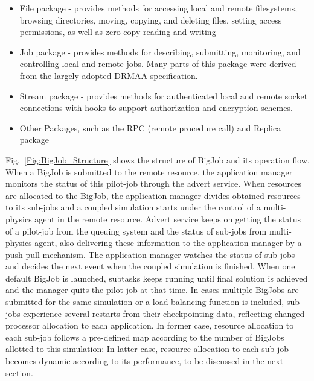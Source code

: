 \documentclass[conference,final]{IEEEtran}
\newcommand{\skonote}[1]{ {\textcolor{blue} { ***Jeff: #1 }}}
\newcommand{\skonote}[1]{}
\begin{document}


\begin{itemize}
\item File package - provides methods for accessing local and remote
 filesystems, browsing directories, moving, copying, and deleting
 files, setting access permissions, as well as zero-copy reading and
 writing
\item Job package - provides methods for describing, submitting,
 monitoring, and controlling local and remote jobs. Many parts of
 this package were derived from the largely adopted
 DRMAA %
 specification.
\item Stream package - provides methods for authenticated local and
 remote socket connections with hooks to support authorization and
 encryption schemes.
\item Other Packages, such as the RPC (remote procedure call) and Replica
 package
\end{itemize}




Fig.~\ref{Fig:BigJob_Structure} shows the structure of BigJob and its
operation flow. When a BigJob is submitted to the remote resource, the
application manager monitors the status of this pilot-job through the
advert service. When resources are allocated to the BigJob, the
application manager divides obtained resources to its sub-jobs and a
coupled simulation starts under the control of a multi-physics agent
in the remote resource. Advert service keeps on getting the status of
a pilot-job from the queuing system and the status of sub-jobs from
multi-physics agent, also delivering these information to the
application manager by a push-pull mechanism. The application manager
watches the status of sub-jobs and decides the next event when the
coupled simulation is finished. When one default BigJob is launched,
subtasks keeps running until final solution is achieved and the
manager quits the pilot-job at that time. In cases multiple BigJobs
are submitted for the same simulation or a load balancing function is
included, sub-jobs experience several restarts from their
checkpointing data, reflecting changed processor allocation to each
application. In former case, resource allocation to each sub-job
follows a pre-defined map according to the number of BigJobs allotted
to this simulation: In latter case, resource allocation to each
sub-job becomes dynamic according to its performance, to be discussed
in the next section.
\end{document}
